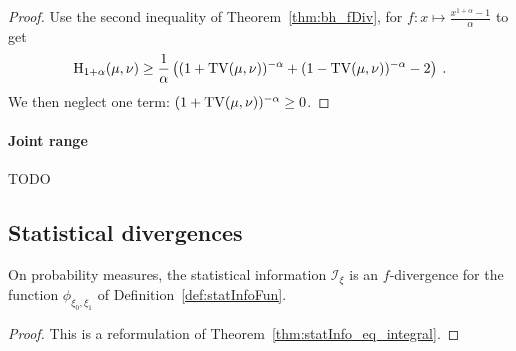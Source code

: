\begin{proof}%
{}
Use the second inequality of Theorem~\ref{thm:bh_fDiv}, for $f: x \mapsto \frac{x^{1+\alpha} - 1}{\alpha}$ to get
\begin{align*}
\operatorname{H}_{1+\alpha}(\mu, \nu) \ge \frac{1}{\alpha} \left((1 + \operatorname{TV}(\mu, \nu))^{-\alpha} + (1 - \operatorname{TV}(\mu, \nu))^{-\alpha} - 2 \right) \: .
\end{align*}
We then neglect one term: $(1 + \operatorname{TV}(\mu, \nu))^{-\alpha} \ge 0$.
\end{proof}


\paragraph{Joint range}

TODO \cite{harremoes2011pairs}


\subsection{Statistical divergences}

\begin{lemma}
  \label{lem:statInfo_eq_fDiv}
  \leanok
  On probability measures, the statistical information $\mathcal I_\xi$ is an $f$-divergence for the function $\phi_{\xi_0, \xi_1}$ of Definition~\ref{def:statInfoFun}.
\end{lemma}

\begin{proof}\leanok
{}
This is a reformulation of Theorem~\ref{thm:statInfo_eq_integral}.
\end{proof}




